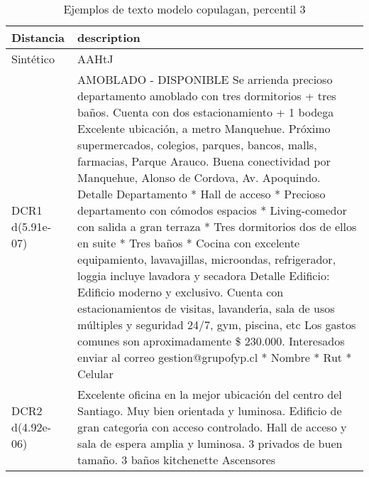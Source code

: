 \begin{table}[H]
\centering
\fontsize{10}{14}\selectfont
\caption{Ejemplos de texto modelo copulagan, percentil 3}
\label{table-example-economicos-a-2-copulagan-3p-text}
\begin{tabular}{|l|m{35em}|}
\hline
\rowcolor[gray]{0.8}
Distancia & description \\
\hline Sintético & AAHtJ \\
\hline DCR1 d(5.91e-07) & AMOBLADO - DISPONIBLE   Se arrienda precioso departamento amoblado con tres dormitorios + tres ba\~nos. Cuenta con dos estacionamiento + 1 bodega  Excelente ubicaci\'on, a metro Manquehue. Pr\'oximo supermercados, colegios, parques, bancos, malls, farmacias, Parque Arauco. Buena conectividad por Manquehue, Alonso de Cordova, Av. Apoquindo.  Detalle Departamento * Hall de acceso * Precioso departamento con c\'omodos espacios * Living-comedor con salida a gran terraza  * Tres dormitorios dos de ellos en suite * Tres ba\~nos * Cocina con excelente equipamiento, lavavajillas, microondas, refrigerador, loggia incluye lavadora y secadora   Detalle Edificio: Edificio moderno y exclusivo. Cuenta con estacionamientos de visitas, lavander{\'\i}a, sala de usos m\'ultiples y seguridad 24/7, gym, piscina, etc  Los gastos comunes son aproximadamente \$ 230.000.  Interesados enviar al correo gestion@grupofyp.cl * Nombre * Rut * Celular \\
\hline DCR2 d(4.92e-06) & Excelente oficina en la mejor ubicaci\'on del centro del Santiago. Muy bien orientada y luminosa.  Edificio de gran categor{\'\i}a con acceso controlado. 
Hall de acceso y sala de espera amplia y luminosa.
3 privados de buen tama\~no.
3 ba\~nos 
kitchenette 
Ascensores \\
\hline
\end{tabular}
\end{table}
